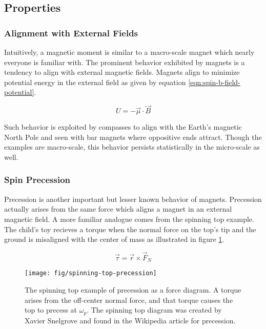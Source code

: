 \subsection{Properties}

\subsubsection{Alignment with External Fields}
Intuitively, a magnetic moment is similar to a macro-scale magnet which nearly everyone is familiar with.  The prominent behavior exhibited by magnets is a tendency to align with external magnetic fields.  Magnets align to minimize potential energy in the external field as given by equation \ref{eqn:spin-b-field-potential}. 

\begin{equation}
\label{eqn:spin-b-field-potential}
U = -\vec{\mu} \cdot \vec{B}
\end{equation}

\noindent 
Such behavior is exploited by compasses to align with the Earth's magnetic North Pole and seen with bar magnets where oppositive ends attract.  Though the examples are macro-scale, this behavior persists statistically in the micro-scale as well.

\subsubsection{Spin Precession}
Precession is another important but lesser known behavior of magnets.  Precession actually arises from the same force which aligns a magnet in an external magnetic field.  A more familiar analogue comes from the spinning top example.  The child's toy recieves a torque when the normal force on the top's tip and the ground is misaligned with the center of mass as illustrated in figure \ref{fig:spinning-top-precession}.

\begin{equation}
\label{eqn:top-torque-equation}
\vec{\tau} = \vec{r} \times \vec{F}_{N}
\end{equation}

\begin{figure}
\centering
\texttt{[image: fig/spinning-top-precession]}
\caption{
    The spinning top example of precession as a force diagram.  A torque arises from the off-center normal force, and that torque causes the top to precess at $\omega_p$.  The spinning top diagram was created by Xavier Snelgrove and found in the Wikipedia article for precession. 
    \label{fig:spinning-top-precession}
}
\end{figure}

